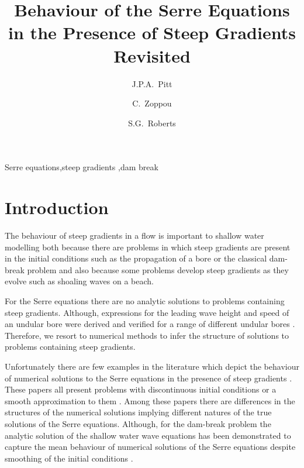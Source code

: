 \documentclass[times]{elsarticle}
\begin{document}
\title{Behaviour of the Serre Equations in the Presence of Steep Gradients Revisited}

\author[ANU]{J.P.A.~Pitt}
\author[ANU]{C.~Zoppou}
\author[ANU]{S.G.~Roberts}

\address[ANU]{Mathematical Sciences Institute, Australian National University, Canberra, ACT 0200, Australia}
 \begin{abstract}

 \end{abstract}	
 
  \begin{keyword}
  	Serre equations\sep steep gradients \sep dam break
  \end{keyword}
  
 \maketitle
\linenumbers
\section{Introduction} \label{intro} 
The behaviour of steep gradients in a flow is important to shallow water modelling both because there are problems in which steep gradients are present in the initial conditions such as the propagation of a bore or the classical dam-break problem and also because some problems develop steep gradients as they evolve such as shoaling waves on a beach. 

For the Serre equations there are no analytic solutions to problems containing steep gradients. Although, expressions for the leading wave height and speed of an undular bore were derived and verified for a range of different undular bores \cite{El-etal-2006}. Therefore, we resort to numerical methods to infer the structure of solutions to problems containing steep gradients. 

Unfortunately there are few examples in the literature which depict the behaviour of numerical solutions to the Serre equations in the presence of steep gradients \cite{El-etal-2006,Hank-etal-2010-2034,Mitsotakis-etal-2014,Mitsotakis-etal-2017}. These papers all present problems with discontinuous initial conditions \cite{Hank-etal-2010-2034} or a smooth approximation to them \cite{El-etal-2006,Mitsotakis-etal-2014,Mitsotakis-etal-2017}. Among these papers there are differences in the structures of the numerical solutions implying different natures of the true solutions of the Serre equations. Although, for the dam-break problem the analytic solution of the shallow water wave equations has been demonstrated to capture the mean behaviour of numerical solutions of the Serre equations despite smoothing of the initial conditions \cite{Hank-etal-2010-2034,Mitsotakis-etal-2014}.  
\end{document}
